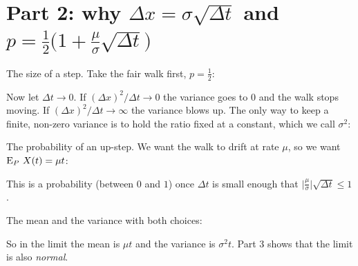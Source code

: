 \section*{Part 2: why $\Delta x=\sigma\sqrt{\Delta t}$ and $p=\frac12\big(1+\frac\mu\sigma\sqrt{\Delta t}\big)$}

\begin{steps}[resume]
\item\label{w:dx} The size of a step. Take the fair walk first, $p=\frac12$:
\begin{deriv}
\end{deriv}
Now let $\Delta t\to0$. If $(\Delta x)^2/\Delta t\to0$ the variance goes to $0$ and the walk stops moving. If $(\Delta x)^2/\Delta t\to\infty$ the variance blows up. The only way to keep a finite, non-zero variance is to hold the ratio fixed at a constant, which we call $\sigma^2$:
\begin{deriv}
\end{deriv}

\item\label{w:p} The probability of an up-step. We want the walk to drift at rate $\mu$, so we want $\operatorname{E}_P\,X(t)=\mu t$:
\begin{deriv}
\end{deriv}
This is a probability (between $0$ and $1$) once $\Delta t$ is small enough that $\big|\frac\mu\sigma\big|\sqrt{\Delta t}\le1$.

\item\label{w:mv} The mean and the variance with both choices:
\begin{deriv}
\end{deriv}
So in the limit the mean is $\mu t$ and the variance is $\sigma^2t$. Part 3 shows that the limit is also \emph{normal}.
\end{steps}

